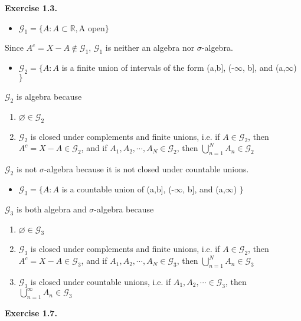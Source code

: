 \documentclass[12pt]{article}
\renewcommand{\emptyset}{\varnothing}
\begin{document}
\textbf{Exercise 1.3.}

\begin{itemize}
\item $\mathcal{G}_{1} = \{A : A \subset \mathbb{R}, \text{A open}\}$
\end{itemize}

Since $A^{c} = X - A \notin \mathcal{G}_{1}$, $\mathcal{G}_{1}$ is neither an algebra nor $\sigma$-algebra.

\begin{itemize}
\item $\mathcal{G}_2 = \{A: A $ is a finite union of intervals of the form (a,b], (-$\infty$, b], and (a,$\infty$) $\}$
\end{itemize}

$\mathcal{G}_2$ is algebra because 

\begin{enumerate}
\item $\emptyset \in \mathcal{G}_2$
\item $\mathcal{G}_2$ is closed under complements and finite unions, i.e. if $A \in  \mathcal{G}_2$, then $A^c = X-A \in  \mathcal{G}_2$, and if $A_1, A_2, \cdots, A_N \in  \mathcal{G}_2$, then $\bigcup_{n=1}^{N} A_n \in  \mathcal{G}_2$
\end{enumerate}

$\mathcal{G}_2$ is not $\sigma$-algebra because it is not closed under countable unions.

\begin{itemize}
\item $\mathcal{G}_3 = \{A: A $ is a countable union of (a,b], (-$\infty$, b], and (a,$\infty$) $\}$
\end{itemize}

$\mathcal{G}_3$ is both algebra and $\sigma$-algebra because 

\begin{enumerate}
\item $\emptyset \in \mathcal{G}_3$
\item $\mathcal{G}_3$ is closed under complements and finite unions, i.e. if $A \in  \mathcal{G}_2$, then $A^c = X-A \in  \mathcal{G}_3$, and if $A_1, A_2, \cdots, A_N \in  \mathcal{G}_3$, then $\bigcup_{n=1}^{N} A_n \in  \mathcal{G}_3$
\item $\mathcal{G}_3$ is closed under countable unions, i.e. if $A_1, A_2, \cdots \in \mathcal{G}_3$, then $\bigcup_{n=1}^{\infty} A_n \in \mathcal{G}_3$
\end{enumerate}

\textbf{Exercise 1.7.}
\end{document}
